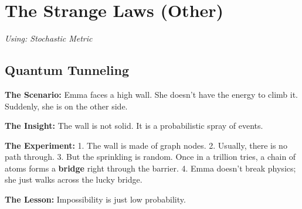 \documentclass[11pt, a4paper, openany]{book}
\begin{document}
\chapter{The Strange Laws (Other)}
\textit{Using: Stochastic Metric}

\section{Quantum Tunneling}
\begin{thoughtexp}
\textbf{The Scenario:} Emma faces a high wall. She doesn't have the energy to climb it. Suddenly, she is on the other side.

\textbf{The Insight:} The wall is not solid. It is a probabilistic spray of events.

\textbf{The Experiment:}
1. The wall is made of graph nodes.
2. Usually, there is no path through.
3. But the sprinkling is random. Once in a trillion tries, a chain of atoms forms a \textbf{bridge} right through the barrier.
4. Emma doesn't break physics; she just walks across the lucky bridge.

\textbf{The Lesson:} Impossibility is just low probability.
\end{thoughtexp}
\end{document}
